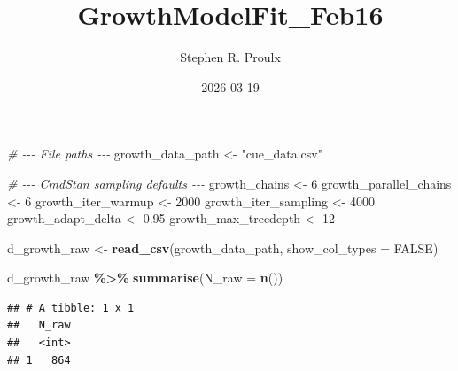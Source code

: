 \documentclass[
]{article}
\title{GrowthModelFit\_Feb16}
\author{Stephen R. Proulx}
\date{2026-03-19}
\newenvironment{Shaded}{\begin{snugshade}}{\end{snugshade}}
\newcommand{\AttributeTok}[1]{\textcolor[rgb]{0.13,0.29,0.53}{#1}}
\newcommand{\CommentTok}[1]{\textcolor[rgb]{0.56,0.35,0.01}{\textit{#1}}}
\newcommand{\ConstantTok}[1]{\textcolor[rgb]{0.56,0.35,0.01}{#1}}
\newcommand{\DecValTok}[1]{\textcolor[rgb]{0.00,0.00,0.81}{#1}}
\newcommand{\FloatTok}[1]{\textcolor[rgb]{0.00,0.00,0.81}{#1}}
\newcommand{\FunctionTok}[1]{\textcolor[rgb]{0.13,0.29,0.53}{\textbf{#1}}}
\newcommand{\NormalTok}[1]{#1}
\newcommand{\OtherTok}[1]{\textcolor[rgb]{0.56,0.35,0.01}{#1}}
\newcommand{\SpecialCharTok}[1]{\textcolor[rgb]{0.81,0.36,0.00}{\textbf{#1}}}
\newcommand{\StringTok}[1]{\textcolor[rgb]{0.31,0.60,0.02}{#1}}
\begin{document}
\maketitle

\begin{Shaded}
\begin{Highlighting}[]
\CommentTok{\# {-}{-}{-} File paths {-}{-}{-}}
\NormalTok{growth\_data\_path }\OtherTok{\textless{}{-}} \StringTok{"cue\_data.csv"} 

\CommentTok{\# {-}{-}{-} CmdStan sampling defaults {-}{-}{-}}
\NormalTok{growth\_chains }\OtherTok{\textless{}{-}} \DecValTok{6}
\NormalTok{growth\_parallel\_chains }\OtherTok{\textless{}{-}} \DecValTok{6}
\NormalTok{growth\_iter\_warmup }\OtherTok{\textless{}{-}} \DecValTok{2000}
\NormalTok{growth\_iter\_sampling }\OtherTok{\textless{}{-}} \DecValTok{4000}
\NormalTok{growth\_adapt\_delta }\OtherTok{\textless{}{-}} \FloatTok{0.95}
\NormalTok{growth\_max\_treedepth }\OtherTok{\textless{}{-}} \DecValTok{12}
\end{Highlighting}
\end{Shaded}

\begin{Shaded}
\begin{Highlighting}[]
\NormalTok{d\_growth\_raw }\OtherTok{\textless{}{-}} \FunctionTok{read\_csv}\NormalTok{(growth\_data\_path, }\AttributeTok{show\_col\_types =} \ConstantTok{FALSE}\NormalTok{)}

\NormalTok{d\_growth\_raw }\SpecialCharTok{\%\textgreater{}\%} \FunctionTok{summarise}\NormalTok{(}\AttributeTok{N\_raw =} \FunctionTok{n}\NormalTok{())}
\end{Highlighting}
\end{Shaded}

\begin{verbatim}
## # A tibble: 1 x 1
##   N_raw
##   <int>
## 1   864
\end{verbatim}
\end{document}
